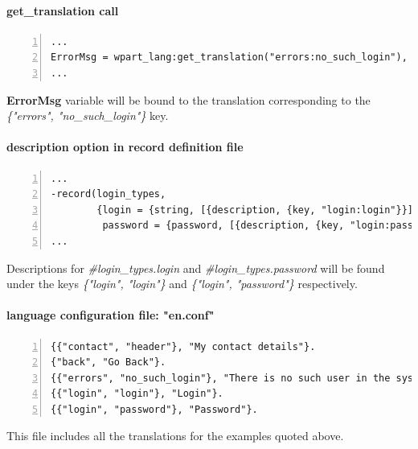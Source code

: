 \paragraph{get\_translation call}
\begin{Verbatim}[numbers=left]
...
ErrorMsg = wpart_lang:get_translation("errors:no_such_login"),
...
\end{Verbatim}
{\bf ErrorMsg} variable will be bound to the translation corresponding to the {\it \{"errors", "no\_such\_login"\}} key.

\paragraph{description option in record definition file}
\begin{Verbatim}[numbers=left]
...
-record(login_types,
        {login = {string, [{description, {key, "login:login"}}]},
         password = {password, [{description, {key, "login:password"}}]}}).
...
\end{Verbatim}
Descriptions for {\it \#login\_types.login} and {\it \#login\_types.password} will be found under the keys {\it \{"login", "login"\}} and {\it \{"login", "password"\}} respectively.

\paragraph{language configuration file: "en.conf"}
\begin{Verbatim}[numbers=left]
{{"contact", "header"}, "My contact details"}.
{"back", "Go Back"}.
{{"errors", "no_such_login"}, "There is no such user in the system"}.
{{"login", "login"}, "Login"}.
{{"login", "password"}, "Password"}.
\end{Verbatim}

This file includes all the translations for the examples quoted above.
